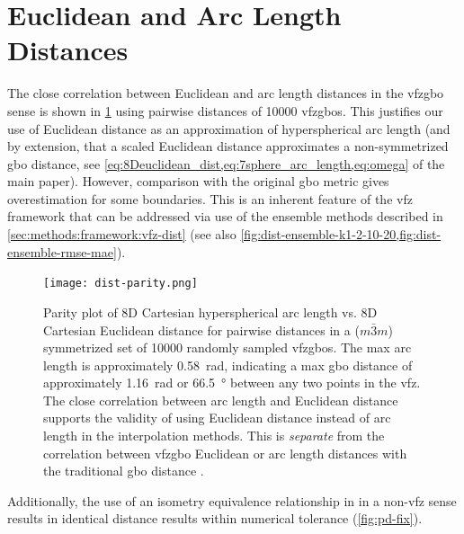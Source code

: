 \documentclass[preprint,12pt]{elsarticle}
\begin{document}
	
	
	\section{Euclidean and Arc Length Distances}
	\label{sec:supp:dist-parity}
	The close correlation between Euclidean and arc length distances in the \gls{vfzgbo} sense is shown in \cref{fig:dist-parity} using pairwise distances of \num{10000} \glspl{vfzgbo}. This justifies our use of Euclidean distance as an approximation of hyperspherical arc length (and by extension, that a scaled Euclidean distance approximates a non-symmetrized \gls{gbo} distance, see \cref{eq:8Deuclidean_dist,eq:7sphere_arc_length,eq:omega} of the main paper). However, comparison with the original \gls{gbo} metric \cite{francisGeodesicOctonionMetric2019} gives overestimation for some boundaries. This is an inherent feature of the \gls{vfz} framework that can be addressed via use of the ensemble methods described in \cref{sec:methods:framework:vfz-dist} (see also \cref{fig:dist-ensemble-k1-2-10-20,fig:dist-ensemble-rmse-mae}).
	
	\begin{figure}
		\centering
		\texttt{[image: dist-parity.png]}
		\caption{Parity plot of 8D Cartesian hyperspherical arc length vs. 8D Cartesian Euclidean distance for pairwise distances in a ($m\bar{3}m$) symmetrized set of \num{10000} randomly sampled \glspl{vfzgbo}. The max arc length is approximately \SI{0.58}{\radian}, indicating a max \gls{gbo} distance of approximately \SI{1.16}{\radian} or \SI{66.5}{\degree} between any two points in the \gls{vfz}. The close correlation between arc length and Euclidean distance supports the validity of using Euclidean distance instead of arc length in the interpolation methods. This is \textit{separate} from the correlation between \gls{vfzgbo} Euclidean or arc length distances with the traditional \gls{gbo} distance \cite{chesserLearningGrainBoundary2020}.}
		\label{fig:dist-parity}
	\end{figure}
	
	Additionally, the use of an isometry equivalence relationship in \citet{morawiecDistancesGrainInterfaces2019} in a non-\gls{vfz} sense results in identical distance results within numerical tolerance (\cref{fig:pd-fix}).
	
\end{document}

